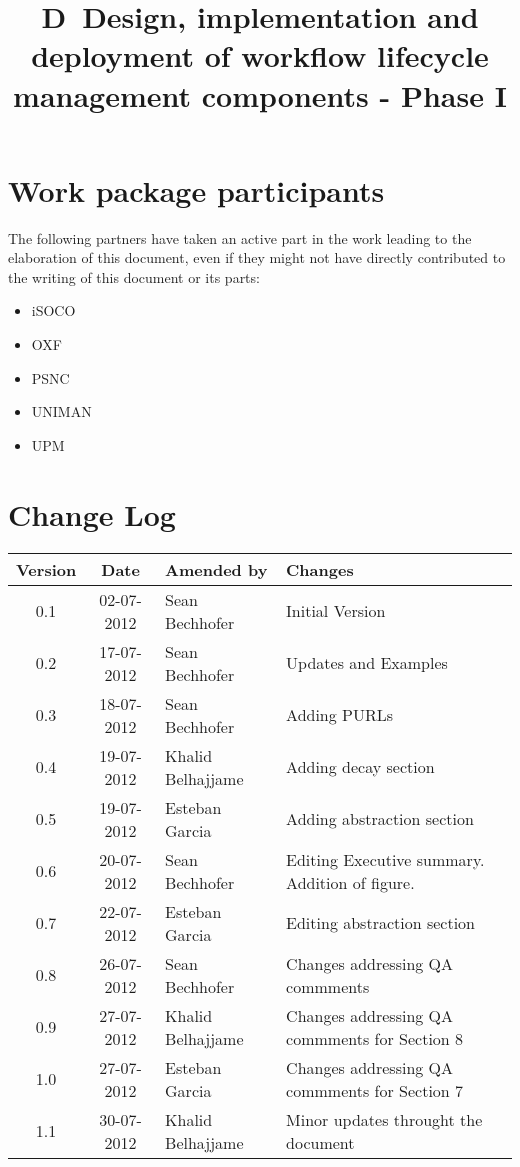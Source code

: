 \documentclass[a4paper, twoside, 11pt]{article}
\title{D\delid\ Design, implementation and deployment of workflow
  lifecycle management components - Phase I}
\begin{document}
\maketitle


\section*{Work package participants} The following partners have taken an active part in the work leading to the elaboration of this document, even if they might not have directly contributed to the writing of this document or its parts: %
\begin{itemize}
\item iSOCO
\item OXF
\item PSNC
\item UNIMAN
\item UPM
\end{itemize}

\section*{Change Log}
\begin{centering}

\begin{tabular}{|c|c|p{4.92cm}|p{6.5cm}|}

\hline \textbf{Version} & \textbf{Date} & \textbf{Amended by} & \textbf{Changes} \\ \hline
0.1 & 02-07-2012 & Sean Bechhofer & Initial Version \\ \hline
0.2 & 17-07-2012 & Sean Bechhofer & Updates and Examples \\ \hline
0.3 & 18-07-2012 & Sean Bechhofer & Adding PURLs\\ \hline
0.4 & 19-07-2012 & Khalid Belhajjame & Adding decay section \\ \hline
0.5 & 19-07-2012 & Esteban Garcia & Adding abstraction section \\ \hline
0.6 & 20-07-2012 & Sean Bechhofer & Editing Executive
summary. Addition of figure. \\ \hline
0.7 & 22-07-2012 & Esteban Garcia & Editing abstraction section \\ \hline
0.8 & 26-07-2012 & Sean Bechhofer & Changes addressing QA commments \\ \hline
0.9 & 27-07-2012 & Khalid Belhajjame & Changes addressing QA commments for Section 8 \\ \hline
1.0 & 27-07-2012 & Esteban Garcia & Changes addressing QA commments for Section 7 \\ \hline
1.1 & 30-07-2012 & Khalid Belhajjame & Minor updates throught the document \\ \hline

\end{tabular}

\end{centering}
\clearpage
\end{document}
